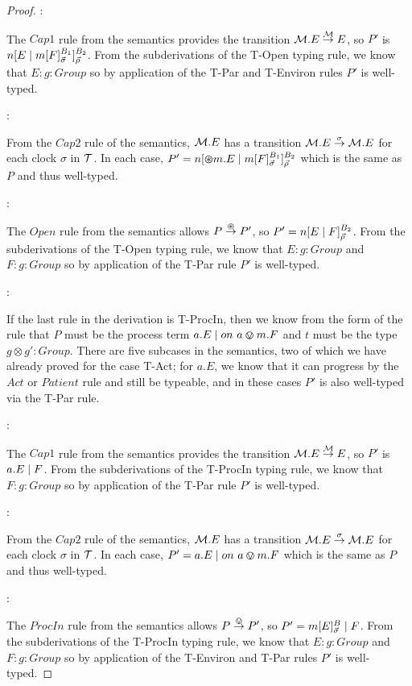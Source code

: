 \begin{proof}
:

\noindent The $Cap1$ rule from the semantics provides the transition
$\text{$\mathcal{M}$}.E \stackrel{\text{$\mathcal{M}$}}{\rightarrow} E$, so $P'$ is \linebreak ${n}[ E \;|\;
  {m}[ F ]^{B_1}_{\vec{\sigma}} ]^{B_2}_{\vec{\rho}}$.  From the
subderivations of the T-Open typing rule, we know that $E : g : Group$
so by application of the T-Par and T-Environ rules $P'$ is well-typed.

:

\noindent From the $Cap2$ rule of the semantics, $\text{$\mathcal{M}$}.E$ has a
transition $\text{$\mathcal{M}$}.E \stackrel{\sigma}{\rightarrow} \text{$\mathcal{M}$}.E$ for each clock
$\sigma$ in $\text{$\mathcal{T}$}$.  In each case, $P' = {n}[ \varoast m.E \;|\;
  {m}[ F ]^{B_1}_{\vec{\sigma}} ]^{B_2}_{\vec{\rho}}$ which is the same
as $P$ and thus well-typed.

:

\noindent The $Open$ rule from the semantics allows $P
\stackrel{\varoast}{\rightarrow} P'$, so $P' = {n}[ E \;|\; F ]^{B_2}_{\vec{\rho}}$.
From the subderivations of the T-Open typing rule, we know that $E : g
: Group$ and $F : g : Group$ so by application of the T-Par rule $P'$
is well-typed.

:

\noindent If the last rule in the derivation is T-ProcIn, then we know
from the form of the rule that $P$ must be the process term $a.E \;|\;
on\ a \varovee m.F$ and $t$ must be the type $g \otimes g': Group$.
There are five subcases in the semantics, two of which we have already
proved for the case T-Act; for $a.E$, we know that it can progress by
the $Act$ or $Patient$ rule and still be typeable, and in these cases
$P'$ is also well-typed via the T-Par rule.

:

\noindent The $Cap1$ rule from the semantics provides the transition
$\text{$\mathcal{M}$}.E \stackrel{\text{$\mathcal{M}$}}{\rightarrow} E$, so $P'$ is $a.E \;|\; F$.  From the
subderivations of the T-ProcIn typing rule, we know that $F : g : Group$
so by application of the T-Par rule $P'$ is well-typed.

:

\noindent From the $Cap2$ rule of the semantics, $\text{$\mathcal{M}$}.E$ has a
transition $\text{$\mathcal{M}$}.E \stackrel{\sigma}{\rightarrow} \text{$\mathcal{M}$}.E$ for each clock
$\sigma$ in $\text{$\mathcal{T}$}$.  In each case, $P' = a.E \;|\; on\ a \varovee m.F$
which is the same as $P$ and thus well-typed.

:

\noindent The $ProcIn$ rule from the semantics allows $P
\stackrel{\varovee}{\rightarrow} P'$, so $P' = {m}[ E ]^{B}_{\vec{\sigma}} \;|\; F$.
From the subderivations of the T-ProcIn typing rule, we know that $E :
g : Group$ and $F : g : Group$ so by application of the T-Environ and
T-Par rules $P'$ is well-typed.


\end{proof}

